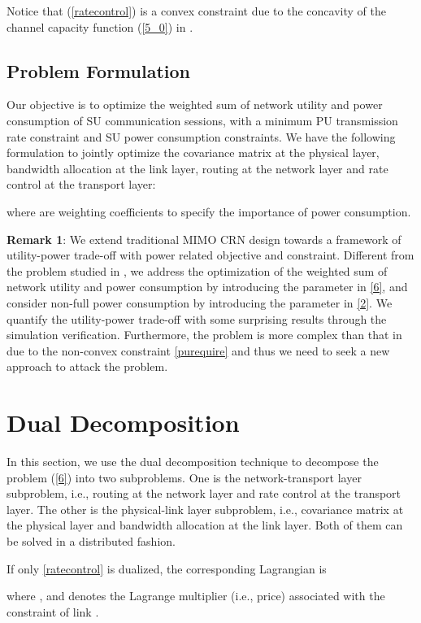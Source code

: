 \documentclass[12pt,onecolumn,tworows]{IEEEtran}
\begin{document}
Notice that (\ref{ratecontrol}) is a convex constraint due to the concavity of the channel capacity function (\ref{5_0}) in .
\subsection{Problem Formulation}\label{ProblemFormulation}
Our objective is to optimize the weighted sum of network
utility and power consumption of SU communication
sessions, with a minimum PU transmission rate constraint
and SU power consumption constraints.
We have the following formulation to jointly optimize the covariance matrix  at the physical layer, bandwidth allocation   at the link layer, routing   at the network layer and rate control   at the transport layer:

where  are weighting coefficients to specify the importance of power consumption.

\textbf{Remark 1}:
We extend traditional MIMO CRN design towards a framework of utility-power trade-off with power related objective and constraint. Different from the problem studied in \cite{LiuJSAC2008}, we address the optimization of the weighted sum of network utility and power consumption by introducing the parameter   in \eqref{6},
and consider non-full power consumption by introducing the parameter  in \eqref{2}. We quantify the utility-power trade-off with some surprising results through the simulation verification. Furthermore, the problem is more complex than that in \cite{LiuJSAC2008} due to the non-convex constraint \eqref{purequire} and thus we need to seek a new approach to attack the problem.

\section{Dual Decomposition}
 In this section, we use the dual decomposition technique
to decompose the problem (\ref{6}) into two subproblems. One is the network-transport layer subproblem, i.e., routing at the network layer and rate control at the transport layer.
The other is the physical-link layer subproblem, i.e.,  covariance matrix at the physical layer and bandwidth allocation at the link layer. Both of them can be solved in a distributed fashion.

If only \eqref{ratecontrol} is dualized, the corresponding Lagrangian is

where , and  denotes the Lagrange multiplier (i.e., price) associated with the constraint  of link .
\end{document}
